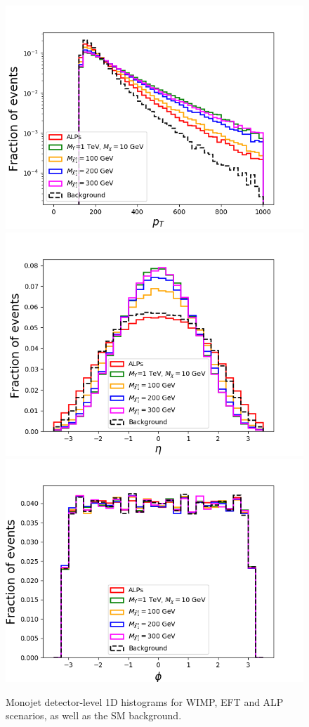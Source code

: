 \documentclass[prd,aps,letterpaper,floatfix,superscriptaddress,preprintnumbers,twocolumn,10pt,nofootinbib]{revtex4-1}
\begin{document}
\begin{figure}[t!]
\centering
\includegraphics[scale=0.3]{figures/ptjallsbdelphes.png}
\includegraphics[scale=0.3]{figures/etajallsbdelphes.png}
\includegraphics[scale=0.3]{figures/phijallsbdelphes.png}
\caption{Monojet detector-level 1D histograms for WIMP, EFT and ALP scenarios, as well as the SM background.\label{1Dand2DfeaturesDL}}
\end{figure}
\end{document}
